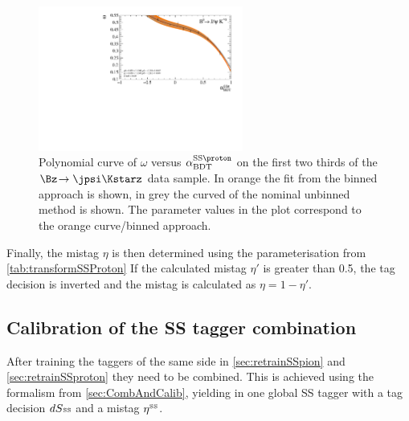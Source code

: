 \begin{figure}[tbp]
	\begin{center}
		\includegraphics[width=0.6\textwidth]{08FlavourTagging/figs/SSProtonBDTTrafo.pdf}
	\end{center}
	\caption{Polynomial curve of $\omega$ versus $\alpha^{\text{SS}\proton}_\text{BDT}$ on the first two thirds of the $\Bz\!\to\jpsi\Kstarz$ data sample.
	In orange the fit from the binned approach is shown, in grey the curved of the nominal unbinned method is shown.
	The parameter values in the plot correspond to the orange curve/binned approach.}
	\label{fig:transformationSSProton}
\end{figure}

Finally, the mistag $\eta$ is then determined using the parameterisation from \cref{tab:transformSSProton}
If the calculated mistag $\eta'$ is greater than \num{0.5}, the tag decision is inverted and the mistag is calculated as $\eta=1-\eta'$.

\subsection{Calibration of the SS tagger combination}
\label{sec:SScombinationcalibration}

After training the taggers of the same side in \cref{sec:retrainSSpion} and \cref{sec:retrainSSproton} they need to be combined.
This is achieved using the formalism from \cref{sec:CombAndCalib}, yielding in one global SS tagger with a tag decision $dS{\text{\tiny SS}}$ and a mistag $\eta^{\text{\tiny SS}}$.

